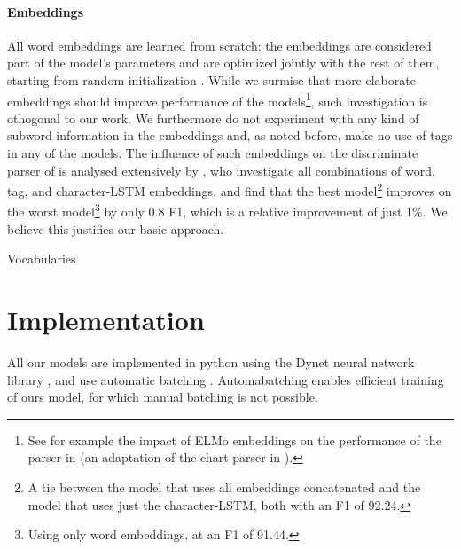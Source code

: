 \paragraph{Embeddings}
All word embeddings are learned from scratch: the embeddings are considered part of the model's parameters and are optimized jointly with the rest of them, starting from random initialization \citep{glorot2010understanding}. While we surmise that more elaborate embeddings should improve performance of the models\footnote{See for example the impact of ELMo embeddings \citep{peters2018elmo} on the performance of the parser in \citet{kitaev2018attentive} (an adaptation of the chart parser in \citet{stern2017minimal}).}, such investigation is othogonal to our work. We furthermore do not experiment with any kind of subword information in the embeddings and, as noted before, make no use of tags in any of the models. The influence of such embeddings on the discriminate parser of \citet{stern2017minimal} is analysed extensively by \citet{stern2018analyis}, who investigate all combinations of word, tag, and character-LSTM embeddings, and find that the best model\footnote{A tie between the model that uses all embeddings concatenated and the model that uses just the character-LSTM, both with an F1 of 92.24.} improves on the worst model\footnote{Using only word embeddings, at an F1 of 91.44.} by only 0.8 F1, which is a relative improvement of just 1\%. We believe this justifies our basic approach.

\begin{table}
  \caption{Vocabularies}
  \label{tab:vocabularies}
\end{table}


\section{Implementation}
All our models are implemented in python using the Dynet neural network library \citep{neubig2017dynet}, and use automatic batching \citep{neubig2017fly}. Automabatching enables efficient training of ours model, for which manual batching is not possible.

